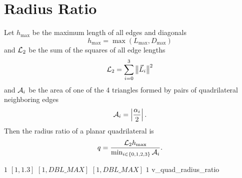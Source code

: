 \section{Radius Ratio}

Let $h_{\max}$ be the maximum length of all edges and diagonals
\[
  h_{\max} = \max\left(L_{\max},D_{\max}\right)
\]
and ${\cal L}_2$ be the sum of the squares of all edge lengths
\[
{\cal L}_2 = \sum_{i=0}^3\big\lVert{\vec L_i}\big\rVert^2
\]
and ${\cal A}_i$ be the area of one of the 4 triangles formed by pairs of quadrilateral neighboring edges
\[
  {\cal A}_i = \left|\frac{\alpha_i}{2}\right|.
\]
Then the radius ratio of a planar quadrilateral is
\[
  q = \frac{{\cal L}_2 h_{\max}}{\min_{i\in\{0,1,2,3\}}{\cal A}_i}.
\]

%
{$1$}%
{$[1,1.3]$}%
{$[1,DBL\_MAX]$}%
{$[1,DBL\_MAX]$}%
{$1$}%
{\cite{pebay:04}}%
{v\_quad\_radius\_ratio}%

